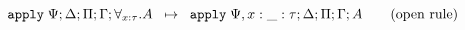 
\[
   \mathtt{apply} \; \Psi; \Delta; \Pi; \Gamma; \forall_{x : \tau}. A \;\; \mapsto \;\; \mathtt{apply} \; \Psi, x : \_ : \tau; \Delta; \Pi; \Gamma; A
                                                             \tag{open rule}
\]
